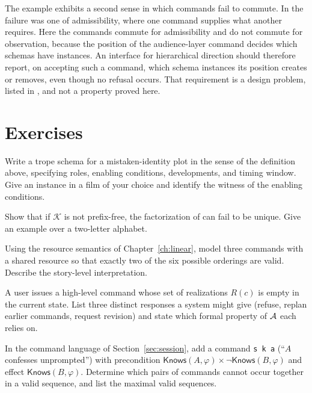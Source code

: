The example exhibits a second sense in which commands fail to commute. In  the failure was one of admissibility, where one command supplies what another requires. Here the commands commute for admissibility and do not commute for observation, because the position of the audience-layer command decides which schemas have instances. An interface for hierarchical direction should therefore report, on accepting such a command, which schema instances its position creates or removes, even though no refusal occurs. That requirement is a design problem, listed in , and not a property proved here.

\section*{Exercises}

\begin{exercise}
Write a trope schema for a mistaken-identity plot in the sense of the definition above, specifying roles, enabling conditions, developments, and timing window. Give an instance in a film of your choice and identify the witness of the enabling conditions.
\end{exercise}

\begin{exercise}
Show that if $\mathcal{K}$ is not prefix-free, the factorization of  can fail to be unique. Give an example over a two-letter alphabet.
\end{exercise}

\begin{exercise}
Using the resource semantics of Chapter~\ref{ch:linear}, model three commands with a shared resource so that exactly two of the six possible orderings are valid. Describe the story-level interpretation.
\end{exercise}

\begin{exercise}
A user issues a high-level command whose set of realizations $R(c)$ is empty in the current state. List three distinct responses a system might give (refuse, replan earlier commands, request revision) and state which formal property of $\mathcal{A}$ each relies on.
\end{exercise}

\begin{exercise}
In the command language of Section~\ref{sec:session}, add a command \texttt{s k a} (``$A$ confesses unprompted'') with precondition $\mathsf{Knows}(A,\varphi)\times\neg\mathsf{Knows}(B,\varphi)$ and effect $\mathsf{Knows}(B,\varphi)$. Determine which pairs of commands cannot occur together in a valid sequence, and list the maximal valid sequences.
\end{exercise}

